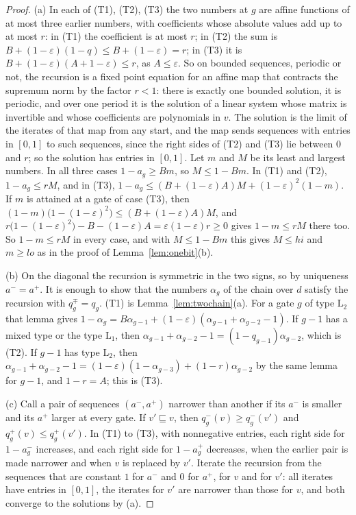 \documentclass[11pt]{amsart}
\theoremstyle{definition}
\theoremstyle{remark}
\newcommand{\eps}{\varepsilon}
\begin{document}
\begin{proof}
(a) In each of (T1), (T2), (T3) the two numbers at $g$ are affine functions of at most three
earlier numbers, with coefficients whose absolute values add up to at most $r$: in (T1) the
coefficient is at most $r$; in (T2) the sum is $B+(1-\eps)(1-q)\le B+(1-\eps)=r$; in (T3) it is
$B+(1-\eps)(A+1-\eps)\le r$, as $A\le\eps$. So on bounded sequences, periodic or not, the
recursion is a fixed point equation for an affine map that contracts the supremum norm by the
factor $r<1$: there is exactly one bounded solution, it is periodic, and over one period it is
the solution of a linear system whose matrix is invertible and whose coefficients are
polynomials in $v$. The solution is the limit of the iterates of that map from any start, and
the map sends sequences with entries in $[0,1]$ to such sequences, since the right sides of
(T2) and (T3) lie between $0$ and $r$; so the solution has entries in $[0,1]$. Let $m$ and $M$
be its least and largest numbers. In all three cases $1-a_g\ge Bm$, so $M\le1-Bm$. In (T1) and
(T2), $1-a_g\le rM$, and in (T3), $1-a_g\le(B+(1-\eps)A)M+(1-\eps)^2(1-m)$. If $m$ is attained
at a gate of case (T3), then $(1-m)\bigl(1-(1-\eps)^2\bigr)\le(B+(1-\eps)A)M$, and
$r\bigl(1-(1-\eps)^2\bigr)-B-(1-\eps)A=\eps(1-\eps)r\ge0$ gives $1-m\le rM$ there too. So
$1-m\le rM$ in every case, and with $M\le1-Bm$ this gives $M\le hi$ and $m\ge lo$ as in the
proof of Lemma~\ref{lem:onebit}(b).

(b) On the diagonal the recursion is symmetric in the two signs, so by uniqueness $a^-=a^+$. It
is enough to show that the numbers $\alpha_g$ of the chain over $d$ satisfy the recursion with
$q^\mp_g=q_g$. (T1) is Lemma~\ref{lem:twochain}(a). For a gate $g$ of type $\mathrm L_2$ that
lemma gives $1-\alpha_g=B\alpha_{g-1}+(1-\eps)(\alpha_{g-1}+\alpha_{g-2}-1)$. If $g-1$ has a
mixed type or the type $\mathrm L_1$, then
$\alpha_{g-1}+\alpha_{g-2}-1=(1-q_{g-1})\alpha_{g-2}$, which is (T2). If $g-1$ has type
$\mathrm L_2$, then
$\alpha_{g-1}+\alpha_{g-2}-1=(1-\eps)(1-\alpha_{g-3})+(1-r)\alpha_{g-2}$ by the same lemma for
$g-1$, and $1-r=A$; this is (T3).

(c) Call a pair of sequences $(a^-,a^+)$ narrower than another if its $a^-$ is smaller and its
$a^+$ larger at every gate. If $v'\sqsubseteq v$, then
$q^-_g(v)\ge q^-_g(v')$ and $q^+_g(v)\le q^+_g(v')$. In (T1) to (T3), with nonnegative entries,
each right side for $1-a^-_g$ increases, and each right side for $1-a^+_g$ decreases, when the
earlier pair is made narrower and when $v$ is replaced by $v'$. Iterate the recursion from the
sequences that are constant $1$ for $a^-$ and $0$ for $a^+$, for $v$ and for $v'$: all iterates
have entries in $[0,1]$, the iterates for $v'$ are narrower than those for $v$, and both converge
to the solutions by (a).


\end{proof}
\end{document}
